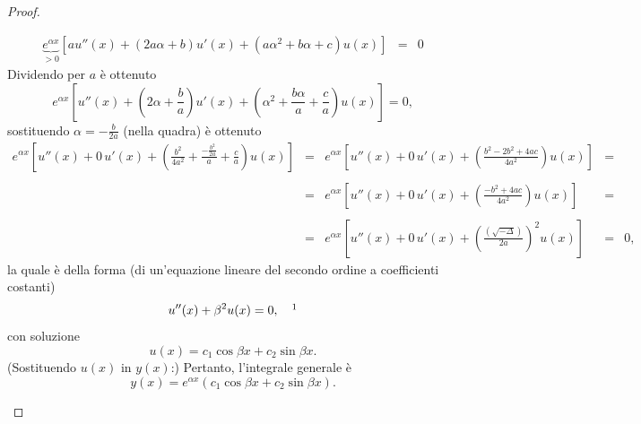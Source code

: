 \begin{proof}
\begin{enumerate}
\begin{equation*}
\begin{matrix}
				\underbrace{e^{\alpha x}}_{>0}[au''(x) + (2a\alpha + b)u'(x)+(a\alpha^2 + b\alpha + c)u(x)] &=& 0
			\end{matrix}
		\end{equation*}
		Dividendo per $a$ è ottenuto
		\begin{equation*}
			e^{\alpha x}\left[u''(x) + \left(2\alpha + \frac{b}{a}\right)u'(x)+\left(\alpha^2 + \frac{b\alpha}{a} + \frac{c}{a}\right)u(x)\right]=0,
		\end{equation*}
		sostituendo $\alpha=-\frac{b}{2a}$ (nella quadra) è ottenuto
		\begin{equation*}
			\begin{matrix}
				e^{\alpha x}\left[u''(x) + 0\, u'(x)+\left(\frac{b^2}{4a^2} + \frac{-\frac{b^2}{2a}}{a}+\frac{c}{a}\right)u(x)\right] &=& e^{\alpha x}\left[u''(x) + 0\, u'(x)+\left(\frac{b^2-2b^2+4ac}{4a^2}\right)u(x)\right] &=&\\\\
				&=& e^{\alpha x}\left[u''(x) + 0\, u'(x)+\left(\frac{-b^2+4ac}{4a^2}\right)u(x)\right] &=&\\\\
				&=& e^{\alpha x}\left[u''(x) + 0\, u'(x)+\left(\frac{(\sqrt{-\Delta})}{2a}\right)^2u(x)\right] &=& 0,
			\end{matrix}
		\end{equation*}
		la quale è della forma (di un'equazione lineare del secondo ordine a coefficienti costanti)
		\begin{equation*}
			u''(x) + \beta^2 u(x) = 0, \quad\footnotemark
		\end{equation*}
		con soluzione
		\begin{equation*}
			u(x) = c_1\cos\beta x + c_2 \sin\beta x.
		\end{equation*}
		\noindent (Sostituendo $u(x)$ in $y(x)$:) Pertanto, l'integrale generale è
		\begin{equation*}
			y(x) = e^{\alpha x}(c_1\cos\beta x + c_2\sin\beta x).
		\end{equation*} 
	\end{enumerate}
\end{proof}

